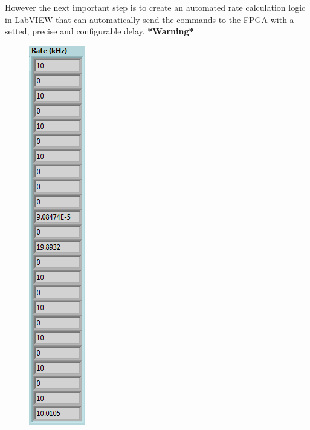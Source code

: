 However the next important step is to create an automated rate calculation logic in LabVIEW that can automatically send the commands to the FPGA with a setted, precise and configurable delay. \textbf{*Warning*}
\begin{figure}[H]
	\centering
	\begin{minipage}{0.24\textwidth}
		\centering
		\includegraphics[width=.7\linewidth]{IMG/ch5/latch_tests/fig16}

\end{minipage}
\end{figure}
